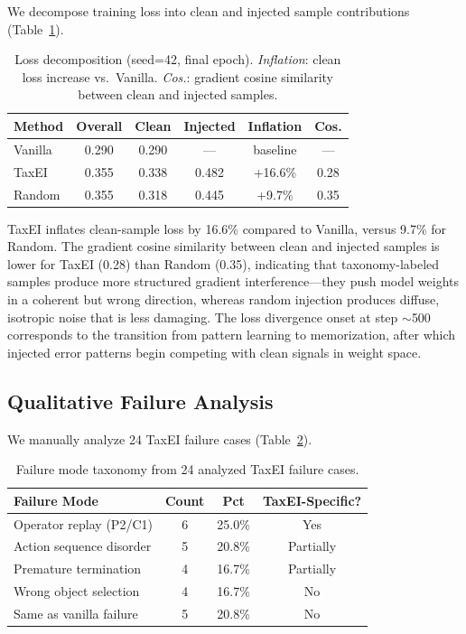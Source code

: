 \documentclass[11pt,a4paper]{article}
\begin{document}
We decompose training loss into clean and injected sample contributions (Table~\ref{tab:loss}).

\begin{table}[t]
\centering
\small
\begin{tabular}{lccccc}
\toprule
\textbf{Method} & \textbf{Overall} & \textbf{Clean} & \textbf{Injected} & \textbf{Inflation} & \textbf{Cos.}\\
\midrule
Vanilla & 0.290 & 0.290 & --- & baseline & --- \\
TaxEI   & 0.355 & 0.338 & 0.482 & +16.6\% & 0.28 \\
Random  & 0.355 & 0.318 & 0.445 & +9.7\%  & 0.35 \\
\bottomrule
\end{tabular}
\caption{Loss decomposition (seed=42, final epoch). \emph{Inflation}: clean loss increase vs.\ Vanilla. \emph{Cos.}: gradient cosine similarity between clean and injected samples.}
\label{tab:loss}
\end{table}

TaxEI inflates clean-sample loss by 16.6\% compared to Vanilla, versus 9.7\% for Random. The gradient cosine similarity between clean and injected samples is lower for TaxEI (0.28) than Random (0.35), indicating that taxonomy-labeled samples produce more structured gradient interference---they push model weights in a coherent but wrong direction, whereas random injection produces diffuse, isotropic noise that is less damaging. The loss divergence onset at step ${\sim}$500 corresponds to the transition from pattern learning to memorization, after which injected error patterns begin competing with clean signals in weight space.

\subsection{Qualitative Failure Analysis}
\label{sec:qualitative}

We manually analyze 24 TaxEI failure cases (Table~\ref{tab:failure}).

\begin{table}[t]
\centering
\small
\begin{tabular}{lccc}
\toprule
\textbf{Failure Mode} & \textbf{Count} & \textbf{Pct} & \textbf{TaxEI-Specific?} \\
\midrule
Operator replay (P2/C1) & 6 & 25.0\% & Yes \\
Action sequence disorder & 5 & 20.8\% & Partially \\
Premature termination    & 4 & 16.7\% & Partially \\
Wrong object selection   & 4 & 16.7\% & No \\
Same as vanilla failure  & 5 & 20.8\% & No \\
\bottomrule
\end{tabular}
\caption{Failure mode taxonomy from 24 analyzed TaxEI failure cases.}
\label{tab:failure}
\end{table}
\end{document}
